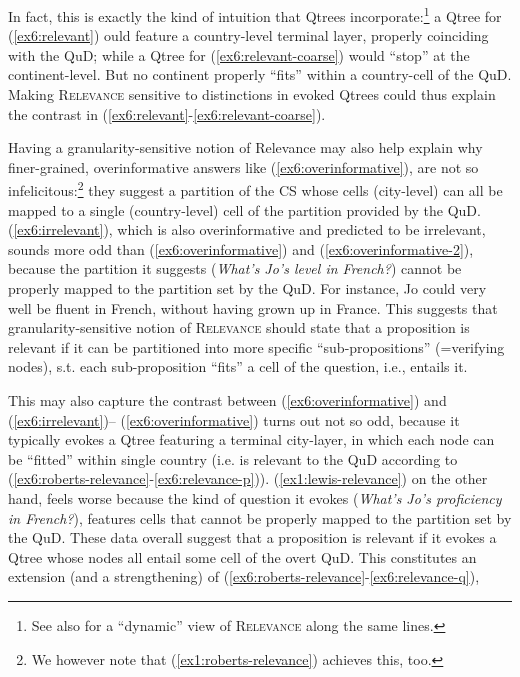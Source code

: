 In fact, this is exactly the kind of intuition that Qtrees incorporate:\footnote{See also \cite{Benbaji2024} for a ``dynamic'' view of \textsc{Relevance} along the same lines.} a Qtree for (\ref{ex6:relevant}) ould feature a country-level terminal layer, properly coinciding with the QuD; while a Qtree for (\ref{ex6:relevant-coarse}) would ``stop'' at the continent-level. But no continent properly ``fits'' within a country-cell of the QuD. Making \textsc{Relevance} sensitive to distinctions in evoked Qtrees could thus explain the contrast in (\ref{ex6:relevant}-\ref{ex6:relevant-coarse}).


 Having a granularity-sensitive notion of Relevance may also help explain why finer-grained, overinformative answers like (\ref{ex6:overinformative}), are not so infelicitous:\footnote{We however note that (\ref{ex1:roberts-relevance}) achieves this, too.} they suggest a partition of the CS whose cells (city-level) can all be mapped to a single (country-level) cell of the partition provided by the QuD. (\ref{ex6:irrelevant}), which is also overinformative and predicted to be irrelevant, sounds more odd than (\ref{ex6:overinformative}) and (\ref{ex6:overinformative-2}), because the partition it suggests (\textit{What's Jo's level in French?}) cannot be properly mapped to the partition set by the QuD. For instance, Jo could very well be fluent in French, without having grown up in France. This suggests that granularity-sensitive notion of \textsc{Relevance} should state that a proposition is relevant if it can be partitioned into more specific ``sub-propositions'' (=verifying nodes), s.t. each sub-proposition ``fits'' a cell of the question, i.e., entails it.


This may also capture the contrast between (\ref{ex6:overinformative}) and (\ref{ex6:irrelevant})-- (\ref{ex6:overinformative}) turns out not so odd, because it typically evokes a Qtree featuring a terminal city-layer, in which each node can be ``fitted'' within single country (i.e. is relevant to the QuD according to (\ref{ex6:roberts-relevance}-\ref{ex6:relevance-p})). (\ref{ex1:lewis-relevance}) on the other hand, feels worse because the kind of question it evokes (\textit{What's Jo's proficiency in French?}), features cells that cannot be properly mapped to the partition set by the QuD. These data overall suggest that a proposition is relevant if it evokes a Qtree whose nodes all entail some cell of the overt QuD. This constitutes an extension (and a strengthening) of (\ref{ex6:roberts-relevance}-\ref{ex6:relevance-q}), 

